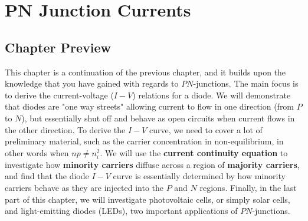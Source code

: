 \chapter{PN Junction Currents}
\label{ch:ch06_pn_currents}
\graphicspath{{./figures/figs_ch06_pn_currents/}}
\section{Chapter Preview}
This chapter is a continuation of the previous chapter, and it builds upon the knowledge that you have gained with regards to $PN$-junctions.  The main focus is to derive the current-voltage ($I-V$) relations for a diode.  We will demonstrate that diodes are "one way streets" allowing current to flow in one direction (from $P$ to $N$), but essentially shut off and behave as open circuits when current flows in the other direction.  To derive the $I-V$ curve, we need to cover a lot of preliminary material, such as the carrier concentration in non-equilibrium, in other words when $n p \neq n_i^2$.  We will use the \textbf{current continuity equation} to investigate how \textbf{minority carriers} diffuse across a region of \textbf{majority carriers}, and find that the diode $I-V$ curve is essentially determined by how minority carriers behave as they are injected into the $P$ and $N$ regions.  Finally, in the last part of this chapter, we will investigate photovoltaic cells, or simply solar cells, and light-emitting diodes (LEDs), two important applications of $PN$-junctions.
\newpage
